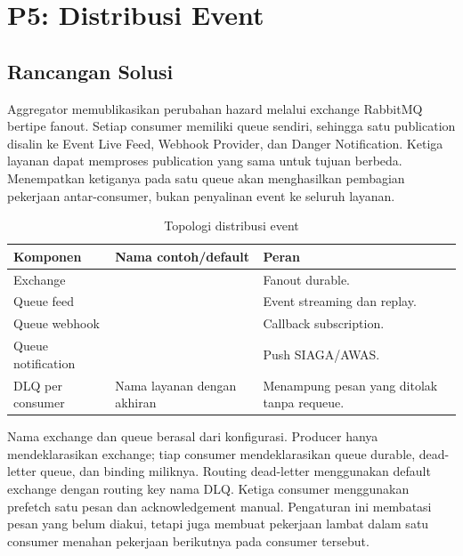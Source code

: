 \chapter{P5: Distribusi Event}
\label{chap:p5}

\section{Rancangan Solusi}

Aggregator memublikasikan perubahan hazard melalui exchange RabbitMQ bertipe
fanout. Setiap consumer memiliki queue sendiri, sehingga satu publication
disalin ke Event Live Feed, Webhook Provider, dan Danger Notification.
Ketiga layanan dapat memproses publication yang sama untuk tujuan berbeda.
Menempatkan ketiganya pada satu queue akan menghasilkan pembagian pekerjaan
antar-consumer, bukan penyalinan event ke seluruh layanan.

\begin{table}[htbp]
    \centering
    \small
    \caption{Topologi distribusi event}
    \begin{tabularx}{\textwidth}{@{}P{0.22\textwidth}X P{0.25\textwidth}@{}}
        \toprule
        \textbf{Komponen} & \textbf{Nama contoh/default} & \textbf{Peran} \\
        \midrule
        Exchange &  & Fanout durable. \\
        Queue feed &  & Event streaming dan replay. \\
        Queue webhook &  & Callback subscription. \\
        Queue notification &  & Push SIAGA/AWAS. \\
        DLQ per consumer & Nama layanan dengan akhiran  & Menampung pesan yang ditolak tanpa requeue. \\
        \bottomrule
    \end{tabularx}
\end{table}

Nama exchange dan queue berasal dari konfigurasi. Producer hanya
mendeklarasikan exchange; tiap consumer mendeklarasikan queue durable,
dead-letter queue, dan binding miliknya. Routing dead-letter menggunakan
default exchange dengan routing key nama DLQ. Ketiga consumer menggunakan
prefetch satu pesan dan acknowledgement manual. Pengaturan ini membatasi
pesan yang belum diakui, tetapi juga membuat pekerjaan lambat dalam satu
consumer menahan pekerjaan berikutnya pada consumer tersebut.

